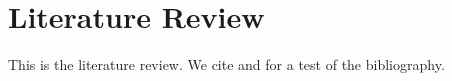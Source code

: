 \documentclass[/../base.tex]{subfiles}
\begin{document}
\biblio{} 
\section{Literature Review}
This is the literature review. We cite \cite{ahnert2014wake} and \cite{brutti2012transmission} for a test of the bibliography.
\end{document}
